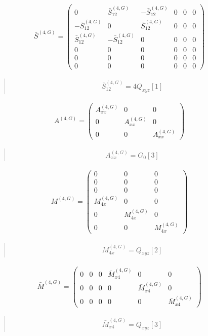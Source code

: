 \documentclass[fleqn,10pt]{jsarticle}
\begin{document}
\begin{align*}
\bar{S}^{(4,G)} = \begin{pmatrix} 0 & \bar{S}^{(4,G)}_{12} & - \bar{S}^{(4,G)}_{12} & 0 & 0 & 0 \\ - \bar{S}^{(4,G)}_{12} & 0 & \bar{S}^{(4,G)}_{12} & 0 & 0 & 0 \\ \bar{S}^{(4,G)}_{12} & - \bar{S}^{(4,G)}_{12} & 0 & 0 & 0 & 0 \\ 0 & 0 & 0 & 0 & 0 & 0 \\ 0 & 0 & 0 & 0 & 0 & 0 \\ 0 & 0 & 0 & 0 & 0 & 0 \end{pmatrix}
\end{align*}
\begin{quote}
\begin{align*}
& \bar{S}^{(4,G)}_{12} = 4 Q_{xyz}[1]
\end{align*}
\end{quote}
\begin{align*}
A^{(4,G)} = \begin{pmatrix} A^{(4,G)}_{xx} & 0 & 0 \\ 0 & A^{(4,G)}_{xx} & 0 \\ 0 & 0 & A^{(4,G)}_{xx} \end{pmatrix}
\end{align*}
\begin{quote}
\begin{align*}
& A^{(4,G)}_{xx} = G_{0}[3]
\end{align*}
\end{quote}
\begin{align*}
M^{(4,G)} = \begin{pmatrix} 0 & 0 & 0 \\ 0 & 0 & 0 \\ 0 & 0 & 0 \\ M^{(4,G)}_{4x} & 0 & 0 \\ 0 & M^{(4,G)}_{4x} & 0 \\ 0 & 0 & M^{(4,G)}_{4x} \end{pmatrix}
\end{align*}
\begin{quote}
\begin{align*}
& M^{(4,G)}_{4x} = Q_{xyz}[2]
\end{align*}
\end{quote}
\begin{align*}
\bar{M}^{(4,G)} = \begin{pmatrix} 0 & 0 & 0 & \bar{M}^{(4,G)}_{x4} & 0 & 0 \\ 0 & 0 & 0 & 0 & \bar{M}^{(4,G)}_{x4} & 0 \\ 0 & 0 & 0 & 0 & 0 & \bar{M}^{(4,G)}_{x4} \end{pmatrix}
\end{align*}
\begin{quote}
\begin{align*}
& \bar{M}^{(4,G)}_{x4} = Q_{xyz}[3]
\end{align*}
\end{quote}
\end{document}
